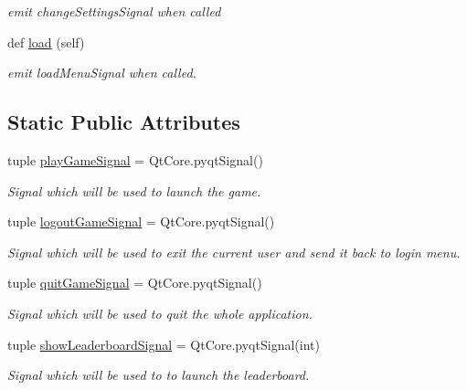 \begin{DoxyCompactItemize}
\begin{DoxyCompactList}\small\item\em emit change\+Settings\+Signal when called \end{DoxyCompactList}\item 
def \hyperlink{classsrc_1_1main__menu_1_1_main_menu_a5a8bd4179063fdebe0f679b4501e6642}{load} (self)
\begin{DoxyCompactList}\small\item\em emit load\+Menu\+Signal when called. \end{DoxyCompactList}\end{DoxyCompactItemize}
\subsection*{Static Public Attributes}
\begin{DoxyCompactItemize}
\item 
tuple \hyperlink{classsrc_1_1main__menu_1_1_main_menu_a5649447e46d6bd6bdc5f1289941c8c02}{play\+Game\+Signal} = Qt\+Core.\+pyqt\+Signal()
\begin{DoxyCompactList}\small\item\em Signal which will be used to launch the game. \end{DoxyCompactList}\item 
tuple \hyperlink{classsrc_1_1main__menu_1_1_main_menu_ac8a9bae484f207fa58edd090112c8be3}{logout\+Game\+Signal} = Qt\+Core.\+pyqt\+Signal()
\begin{DoxyCompactList}\small\item\em Signal which will be used to exit the current user and send it back to login menu. \end{DoxyCompactList}\item 
tuple \hyperlink{classsrc_1_1main__menu_1_1_main_menu_adb966ecda1f332af67efc3c3b3adf8bd}{quit\+Game\+Signal} = Qt\+Core.\+pyqt\+Signal()
\begin{DoxyCompactList}\small\item\em Signal which will be used to quit the whole application. \end{DoxyCompactList}\item 
tuple \hyperlink{classsrc_1_1main__menu_1_1_main_menu_aa737b525a5e965eb6af321d25baa787c}{show\+Leaderboard\+Signal} = Qt\+Core.\+pyqt\+Signal(int)
\begin{DoxyCompactList}\small\item\em Signal which will be used to to launch the leaderboard. \end{DoxyCompactList}\item 

\end{DoxyCompactItemize}

